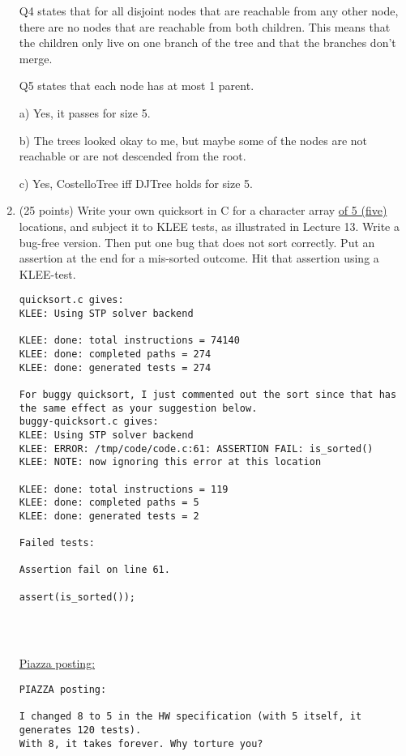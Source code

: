 \documentclass[11pt]{article}
\begin{document}
\begin{enumerate}
Q4 states that for all disjoint nodes that are reachable from any other node, there are no nodes that are reachable from both children. This means that the children only live on one branch of the tree and that the branches don't merge.

Q5 states that each node has at most 1 parent.

a) Yes, it passes for size 5.

b) The trees looked okay to me, but maybe some of the nodes are not reachable or are not descended from the root.

c) Yes, CostelloTree iff DJTree holds for size 5.

\clearpage

\item (25 points) Write your own quicksort in C for a character array \underline{of 5 (five)}
  locations, and subject it to KLEE tests, as illustrated in
  Lecture 13. Write a bug-free version. Then put one bug that does not sort correctly.
  Put an assertion at the end for a mis-sorted outcome. Hit that assertion using a KLEE-test.

 \begin{verbatim}
quicksort.c gives:
KLEE: Using STP solver backend

KLEE: done: total instructions = 74140
KLEE: done: completed paths = 274
KLEE: done: generated tests = 274

For buggy quicksort, I just commented out the sort since that has the same effect as your suggestion below.
buggy-quicksort.c gives:
KLEE: Using STP solver backend
KLEE: ERROR: /tmp/code/code.c:61: ASSERTION FAIL: is_sorted()
KLEE: NOTE: now ignoring this error at this location

KLEE: done: total instructions = 119
KLEE: done: completed paths = 5
KLEE: done: generated tests = 2

Failed tests:

Assertion fail on line 61.

assert(is_sorted());


 
 \end{verbatim}

  \underline{Piazza posting:}

  \begin{scriptsize}
\begin{verbatim}
PIAZZA posting:

I changed 8 to 5 in the HW specification (with 5 itself, it generates 120 tests).
With 8, it takes forever. Why torture you?


\end{verbatim}
\end{scriptsize}
\end{enumerate}
\end{document}
